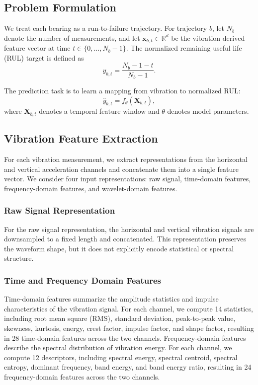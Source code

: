 \documentclass{article}
\begin{document}
\subsection{Problem Formulation}

We treat each bearing as a run-to-failure trajectory.
For trajectory $b$, let $N_b$ denote the number of measurements, and let $\mathbf{x}_{b,t}\in\mathbb{R}^{d}$ be the vibration-derived feature vector at time $t\in\{0,\ldots,N_b-1\}$.
The normalized remaining useful life (RUL) target is defined as
\[
y_{b,t}=\frac{N_b-1-t}{N_b-1}.
\]

The prediction task is to learn a mapping from vibration to normalized RUL:
\[
\hat{y}_{b,t}=f_{\theta}(\mathbf{X}_{b,t}),
\]
where $\mathbf{X}_{b,t}$ denotes a temporal feature window and $\theta$ denotes model parameters.

\subsection{Vibration Feature Extraction}

For each vibration measurement, we extract representations from the horizontal and vertical acceleration channels and concatenate them into a single feature vector.
We consider four input representations: raw signal, time-domain features, frequency-domain features, and wavelet-domain features.

\subsubsection{Raw Signal Representation}

For the raw signal representation, the horizontal and vertical vibration signals are downsampled to a fixed length and concatenated.
This representation preserves the waveform shape, but it does not explicitly encode statistical or spectral structure.

\subsubsection{Time and Frequency Domain Features}

Time-domain features summarize the amplitude statistics and impulse characteristics of the vibration signal.
For each channel, we compute 14 statistics, including root mean square (RMS), standard deviation, peak-to-peak value, skewness, kurtosis, energy, crest factor, impulse factor, and shape factor, resulting in 28 time-domain features across the two channels.
Frequency-domain features describe the spectral distribution of vibration energy.
For each channel, we compute 12 descriptors, including spectral energy, spectral centroid, spectral entropy, dominant frequency, band energy, and band energy ratio, resulting in 24 frequency-domain features across the two channels.
\end{document}
